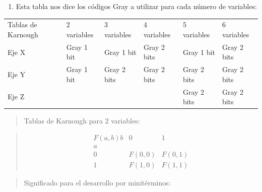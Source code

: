 \begin{enumerate}
\begin{enumerate}
\begin{enumerate}
\begin{enumerate}
        \begin{enumerate}
        \def\labelenumv{\arabic{enumv}.}
        \tightlist
        \item
          \begin{enumerate}
          \def\labelenumvi{\arabic{enumvi}.}
          \tightlist
          \item
            Comenzaremos por ver los métodos de Tablas de Karnough. Para
            éstas utilizamos códigos Gray de los bits necesarios.
          \end{enumerate}
        \end{enumerate}
      \end{enumerate}
    \end{enumerate}
  \end{enumerate}
\item
  Esta tabla nos dice los códigos Gray a utilizar para cada número de
  variables:
\end{enumerate}

{\def\LTcaptype{none} %
\begin{longtable}[]{@{}llllll@{}}
\toprule\noalign{}
\endhead
\bottomrule\noalign{}
\endlastfoot
Tablas de Karnough & 2 variables & 3 variables & 4 variables & 5
variables & 6 variables \\
Eje X & Gray 1 bit & Gray 1 bit & Gray 2 bits & Gray 1 bit & Gray 2
bits \\
Eje Y & Gray 1 bit & Gray 2 bits & Gray 2 bits & Gray 2 bits & Gray 2
bits \\
Eje Z & & & & Gray 2 bits & Gray 2 bits \\
\end{longtable}
}

\begin{quote}
Tablas de Karnough para 2 variables:
\end{quote}

\begin{quote}
\[\begin{matrix}
{F{({a,b})}b} & 0 & 1 \\
a & & \\
0 & {F{(0,0)}} & {F{(0,1)}} \\
1 & {F{(1,0)}} & {F{(1,1)}}
\end{matrix}\]
\end{quote}

\begin{quote}
Significado para el desarrollo por minitérminos:
\end{quote}

